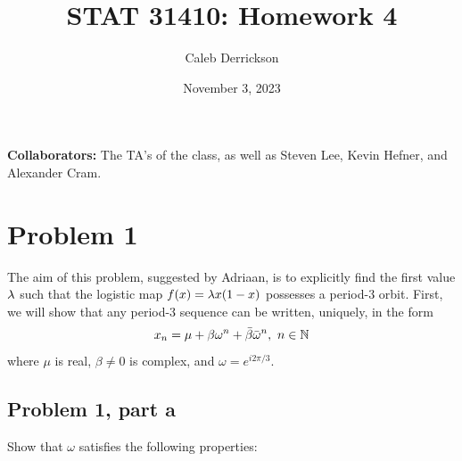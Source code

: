 

\title{STAT 31410: Homework 4}
\author{Caleb Derrickson}
\date{November 3, 2023}


\onehalfspacing
\maketitle
\allowdisplaybreaks
{\color{cit}\vspace{2mm}\noindent\textbf{Collaborators:}} The TA's of the class, as well as Steven Lee, Kevin Hefner, and Alexander Cram.

\tableofcontents

\newpage
\section{Problem 1}
The aim of this problem, suggested by Adriaan, is to explicitly find the first value $\lambda$ such that the logistic map $f(x) = \lambda x(1 - x)$ possesses a period-3 orbit. First, we will show that any period-3 sequence can be written, uniquely, in the form
\[
x_n = \mu + \beta \omega^n + \Bar{\beta}\Bar{\omega}^n, \ n \in \mathbb{N}
\]
where $\mu$ is real, $\beta \neq 0$ is complex, and $\omega = e^{i2\pi / 3}$.
\subsection{Problem 1, part a}
Show that $\omega$ satisfies the following properties:

